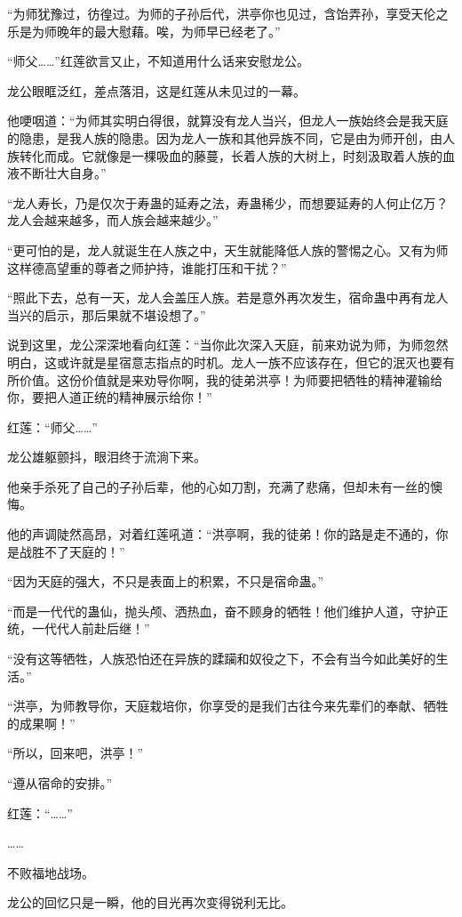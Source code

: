 \begin{this_body}
“为师犹豫过，彷徨过。为师的子孙后代，洪亭你也见过，含饴弄孙，享受天伦之乐是为师晚年的最大慰藉。唉，为师早已经老了。”

“师父……”红莲欲言又止，不知道用什么话来安慰龙公。

龙公眼眶泛红，差点落泪，这是红莲从未见过的一幕。

他哽咽道：“为师其实明白得很，就算没有龙人当兴，但龙人一族始终会是我天庭的隐患，是我人族的隐患。因为龙人一族和其他异族不同，它是由为师开创，由人族转化而成。它就像是一棵吸血的藤蔓，长着人族的大树上，时刻汲取着人族的血液不断壮大自身。”

“龙人寿长，乃是仅次于寿蛊的延寿之法，寿蛊稀少，而想要延寿的人何止亿万？龙人会越来越多，而人族会越来越少。”

“更可怕的是，龙人就诞生在人族之中，天生就能降低人族的警惕之心。又有为师这样德高望重的尊者之师护持，谁能打压和干扰？”

“照此下去，总有一天，龙人会盖压人族。若是意外再次发生，宿命蛊中再有龙人当兴的启示，那后果就不堪设想了。”

说到这里，龙公深深地看向红莲：“当你此次深入天庭，前来劝说为师，为师忽然明白，这或许就是星宿意志指点的时机。龙人一族不应该存在，但它的泯灭也要有所价值。这份价值就是来劝导你啊，我的徒弟洪亭！为师要把牺牲的精神灌输给你，要把人道正统的精神展示给你！”

红莲：“师父……”

龙公雄躯颤抖，眼泪终于流淌下来。

他亲手杀死了自己的子孙后辈，他的心如刀割，充满了悲痛，但却未有一丝的懊悔。

他的声调陡然高昂，对着红莲吼道：“洪亭啊，我的徒弟！你的路是走不通的，你是战胜不了天庭的！”

“因为天庭的强大，不只是表面上的积累，不只是宿命蛊。”

“而是一代代的蛊仙，抛头颅、洒热血，奋不顾身的牺牲！他们维护人道，守护正统，一代代人前赴后继！”

“没有这等牺牲，人族恐怕还在异族的蹂躏和奴役之下，不会有当今如此美好的生活。”

“洪亭，为师教导你，天庭栽培你，你享受的是我们古往今来先辈们的奉献、牺牲的成果啊！”

“所以，回来吧，洪亭！”

“遵从宿命的安排。”

红莲：“……”

……

不败福地战场。

龙公的回忆只是一瞬，他的目光再次变得锐利无比。


\end{this_body}
